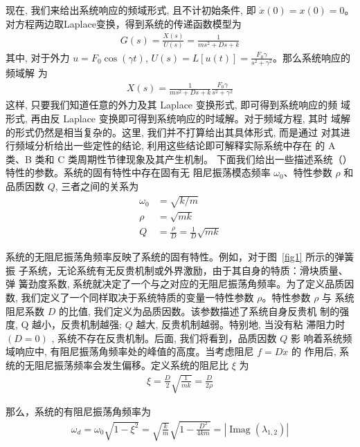 \documentclass[withoutpreface,bwprint]{cumcmthesis} %
\begin{document}
现在, 我们来给出系统响应的频域形式, 且不计初始条件, 即 $ \dot{x}(0)=x(0)=0  $。 对方程两边取Laplace变换，得到系统的传递函数模型为~
\begin{align}
\label{eq9}
G(s)=\frac{X(s)}{U(s)}=\frac{1}{m s^{2}+D s+k}
\end{align}
其中, 对于外力 $ u=F_{0} \cos (\gamma t)$, $U(s)=L[u(t)]=\frac{F_{0} \gamma}{s^{2}+\gamma^{2}}  $。那么系统响应的频域解
为
\begin{align}
\label{eq10}
X(s)=\frac{1}{m s^{2}+D s+k} \frac{F_{0} \gamma}{s^{2}+\gamma^{2}}
\end{align}
这样, 只要我们知道任意的外力及其 Laplace 变换形式, 即可得到系统响应的频 域形式, 再由反 Laplace 变换即可得到系统响应的时域解。对于频域方程, 其时 域解的形式仍然是相当复杂的。这里, 我们并不打算给出其具体形式, 而是通过 对其进行频域分析给出一些定性的结论, 利用这些结论即可解释实际系统中存在 的 $ \mathrm{A} $ 类、B 类和 $ \mathrm{C} $ 类周期性节律现象及其产生机制。 下面我们给出一些描述系统（）特性的参数。系统的固有特性中存在固有无 阻尼振荡模态频率 $ \omega_{0}  $、特性参数 $ \rho $ 和品质因数 $ Q $, 三者之间的关系为
\begin{align}
\label{eq11}
\omega_{0}&=\sqrt{k/m} \\
\label{eq12}
\rho&=\sqrt{m k} \\
\label{eq13}
Q&=\frac{\rho}{D}=\frac{1}{D} \sqrt{m k}
\end{align}

系统的无阻尼振荡角频率反映了系统的固有特性。例如，对于图~\ref{fig1} 所示的弹簧振 子系统，无论系统有无反贵机制或外界激励，由于其自身的特质：滑块质量、弹 簧劲度系数, 系统就决定了一个与之对应的无阻尼振荡角频率。为了定义品质因 数, 我们定义了一个同样取决于系统特质的变量一特性参数 $ \rho  $。特性参数 $ \rho $ 与 系统阻尼系数 $ D $ 的比值, 我们定义为品质因数。该参数描述了系统自身反贵机 制的强度,  Q  越小，反贵机制越强; $ Q $ 越大, 反贵机制越弱。特别地, 当没有粘 滞阻力时 $ (D=0)$ , 系统不存在反贵机制。后面, 我们将看到，品质因数 $ Q$  影 响着系统频域响应中, 有阻尼振荡角频率处的峰值的高度。当考虑阻尼 $ f=D \dot{x} $ 的 作用后, 系统的无阻尼振荡频率会发生偏移。定义系统的阻尼比 $ \xi $ 为
\begin{align}
\label{eq14}
\xi=\frac{D}{2} \sqrt{\frac{1}{m k}}=\frac{D}{2 \rho}
\end{align}

那么，系统的有阻尼振荡角频率为
\begin{align}
\label{eq15}
\omega_{d}=\omega_{0} \sqrt{1-\xi^{2}}=\sqrt{\frac{k}{m}} \sqrt{1-\frac{D^{2}}{4 k m}}=\left|\operatorname{Imag}\left(\lambda_{1,2}\right)\right|
\end{align}
\end{document}
